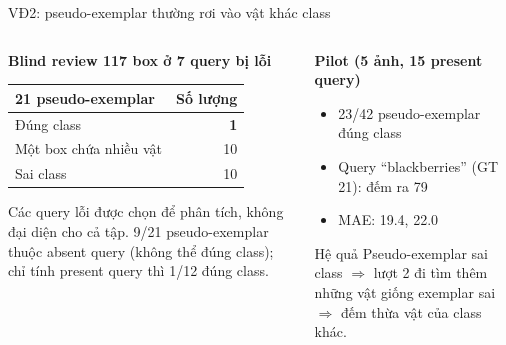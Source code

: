 \documentclass[aspectratio=169,10pt]{beamer}
\gdef\currentsource{}
\newcommand{\source}[1]{\gdef\currentsource{#1}}
\begin{document}
\begin{frame}{VĐ2: pseudo-exemplar thường rơi vào vật khác class}
\source{Blind review N4 (Triệu gán nhãn, Trí đối chiếu 9/9 box trùng); pilot 5 ảnh}
\begin{columns}[T]
\begin{column}{0.48\textwidth}
\textbf{Blind review 117 box ở 7 query bị lỗi}
\begin{center}\small
\begin{tabular}{@{}lr@{}}
\toprule
21 pseudo-exemplar & Số lượng\\
\midrule
Đúng class & \textbf{1}\\
Một box chứa nhiều vật & 10\\
Sai class & 10\\
\bottomrule
\end{tabular}
\end{center}
{\scriptsize Các query lỗi được chọn để phân tích, không đại diện cho cả tập. 9/21 pseudo-exemplar thuộc absent query (không thể đúng class); chỉ tính present query thì 1/12 đúng class.}
\end{column}
\begin{column}{0.48\textwidth}
\textbf{Pilot (5 ảnh, 15 present query)}
\begin{itemize}\small
\item 23/42 pseudo-exemplar đúng class
\item Query ``blackberries'' (GT 21): \Btwo{} đếm ra \alert{79}
\item MAE: \Bzero{} 19.4, \Btwo{} 22.0
\end{itemize}
\begin{block}{Hệ quả}
\small Pseudo-exemplar sai class $\Rightarrow$ lượt 2 đi tìm thêm những vật giống exemplar sai $\Rightarrow$ đếm thừa vật của class khác.
\end{block}
\end{column}
\end{columns}
\end{frame}
\end{document}
